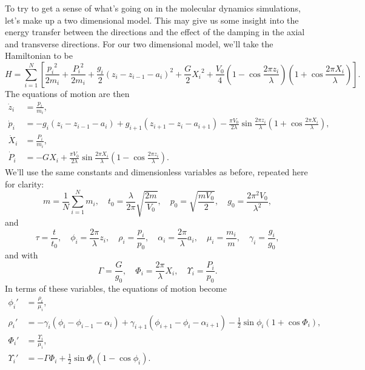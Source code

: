 \documentclass[11pt]{article}
\begin{document}
To try to get a sense of what's going on in the molecular dynamics simulations, let's make up a two dimensional model. This may give us some insight into the energy transfer between the directions and the effect of the damping in the axial and transverse directions. For our two dimensional model, we'll take the Hamiltonian to be
\[
H=\sum_{i=1}^N\left[\frac{{p_i}^2}{2m_i}+\frac{{P_i}^2}{2m_i}
	+\frac{g_i}{2}\left(z_i-z_{i-1}-a_i\right)^2
	+\frac{G}{2}{X_i}^2
	+\frac{V_0}{4}\left(1-\cos\frac{2\pi z_i}{\lambda}\right)
		\left(1+\cos\frac{2\pi X_i}{\lambda}\right)\right].
\]
The equations of motion are then
\begin{align*}
\dot{z}_i&=\frac{p_i}{m_i},\\
\dot{p}_i&=-g_i(z_i-z_{i-1}-a_i)
	+g_{i+1}(z_{i+1}-z_i-a_{i+1})
	-\frac{\pi V_0}{2\lambda}\sin\frac{2\pi z_i}{\lambda}
		\left(1+\cos\frac{2\pi X_i}{\lambda}\right),\\
\dot{X}_i&=\frac{P_i}{m_i},\\
\dot{P}_i&=-GX_i+\frac{\pi V_0}{2\lambda}\sin\frac{2\pi X_i}{\lambda}
		\left(1-\cos\frac{2\pi z_i}{\lambda}\right).
\end{align*}
We'll use the same constants and dimensionless variables as before, repeated here for clarity:
\[
m=\frac{1}{N}\sum_{i=1}^N m_i,\quad
t_0 = \frac{\lambda}{2\pi}\sqrt{\frac{2m}{V_0}},\quad
p_0 = \sqrt{\frac{mV_0}{2}},\quad
g_0 = \frac{2\pi^2V_0}{\lambda^2},
\]
and
\[
\tau=\frac{t}{t_0},\quad
\phi_i=\frac{2\pi}{\lambda} z_i,\quad
\rho_i=\frac{p_i}{p_0},\quad
\alpha_i=\frac{2\pi}{\lambda} a_i,\quad
\mu_i=\frac{m_i}{m},\quad
\gamma_i=\frac{g_i}{g_0},
\]
and with
\[
\Gamma=\frac{G}{g_0},\quad
\Phi_i=\frac{2\pi}{\lambda}X_i,\quad
\Upsilon_i=\frac{P_i}{p_0}.
\]
In terms of these variables, the equations of motion become
\begin{align*}
\phi_i'&=\frac{\rho_i}{\mu_i},\\
\rho_i'&=-\gamma_i(\phi_i-\phi_{i-1}-\alpha_i)
	+\gamma_{i+1}(\phi_{i+1}-\phi_i-\alpha_{i+1})
	-\frac{1}{2}\sin\phi_i\left(1+\cos\Phi_i\right),\\
\Phi_i'&=\frac{\Upsilon_i}{\mu_i},\\
\Upsilon_i'&=-\Gamma\Phi_i
	+\frac{1}{2}\sin\Phi_i\left(1-\cos\phi_i\right).
\end{align*}
\end{document}
